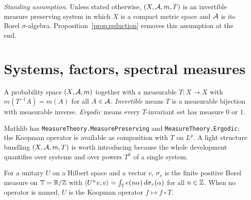 \label{chap:mps}

\emph{Standing assumption.}  Unless stated otherwise, $(X,\mathcal{A},m,T)$ is an invertible measure
preserving system in which $X$ is a compact metric space and $\mathcal{A}$ is its Borel
$\sigma$-algebra.  Proposition~\ref{prop:reduction} removes this assumption at the end.

\section{Systems, factors, spectral measures}

\begin{definition}
  \label{def:mps}
  \leanok
  A probability space $(X,\mathcal{A},m)$ together with a measurable $T : X \to X$ with
  $m(T^{-1}A) = m(A)$ for all $A \in \mathcal{A}$.  \emph{Invertible} means $T$ is a measurable
  bijection with measurable inverse.  \emph{Ergodic} means every $T$-invariant set has measure
  $0$ or $1$.
\end{definition}

\begin{remark}
  Mathlib has \texttt{MeasureTheory.MeasurePreserving} and
  \texttt{MeasureTheory.Ergodic}; the Koopman operator is available as composition with $T$ on
  $L^p$.  A light structure bundling $(X,\mathcal{A},m,T)$ is worth introducing because the whole
  development quantifies over systems and over powers $T^k$ of a single system.
\end{remark}

\begin{definition}
  \label{def:spectral-measure}
  \leanok
  For a unitary $U$ on a Hilbert space and a vector $v$, $\sigma_v$ is the finite positive Borel
  measure on $\mathbb{T} = \mathbb{R}/\mathbb{Z}$ with $\langle U^n v, v \rangle = \int_{\mathbb{T}} e(n\alpha) \, d\sigma_v(\alpha)$
  for all $n \in \mathbb{Z}$.  When no operator is named, $U$ is the Koopman operator $f \mapsto f \circ T$.
\end{definition}

